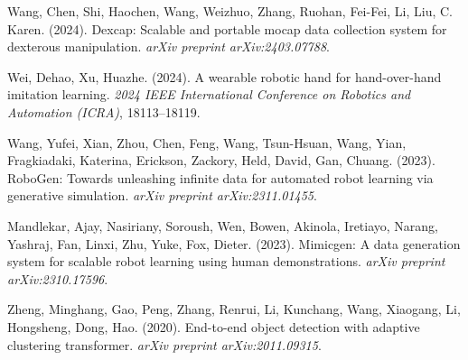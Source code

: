 \documentclass[a4paper]{article}
\begin{document}
\begin{thebibliography}{99}
Wang, Chen, Shi, Haochen, Wang, Weizhuo, Zhang, Ruohan, Fei-Fei, Li, Liu, C. Karen. (2024). Dexcap: Scalable and portable mocap data collection system for dexterous manipulation. \textit{arXiv preprint arXiv:2403.07788}.

Wei, Dehao, Xu, Huazhe. (2024). A wearable robotic hand for hand-over-hand imitation learning. \textit{2024 IEEE International Conference on Robotics and Automation (ICRA)}, 18113--18119.

Wang, Yufei, Xian, Zhou, Chen, Feng, Wang, Tsun-Hsuan, Wang, Yian, Fragkiadaki, Katerina, Erickson, Zackory, Held, David, Gan, Chuang. (2023). RoboGen: Towards unleashing infinite data for automated robot learning via generative simulation. \textit{arXiv preprint arXiv:2311.01455}.

Mandlekar, Ajay, Nasiriany, Soroush, Wen, Bowen, Akinola, Iretiayo, Narang, Yashraj, Fan, Linxi, Zhu, Yuke, Fox, Dieter. (2023). Mimicgen: A data generation system for scalable robot learning using human demonstrations. \textit{arXiv preprint arXiv:2310.17596}.

Zheng, Minghang, Gao, Peng, Zhang, Renrui, Li, Kunchang, Wang, Xiaogang, Li, Hongsheng, Dong, Hao. (2020). End-to-end object detection with adaptive clustering transformer. \textit{arXiv preprint arXiv:2011.09315}.


\end{thebibliography}
\end{document}
